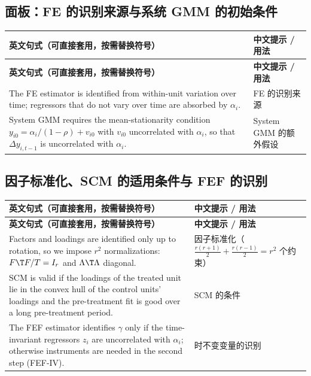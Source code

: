 \subsection{面板：FE 的识别来源与系统 GMM 的初始条件}

{\renewcommand{\arraystretch}{1.15}\begin{longtable}{@{}>{\raggedright\arraybackslash}p{11.4cm}>{\raggedright\arraybackslash\small}p{4.3cm}@{}}
\toprule
\textbf{英文句式（可直接套用，按需替换符号）} & \textbf{中文提示 / 用法}\\
\midrule
\endfirsthead
\toprule
\textbf{英文句式（可直接套用，按需替换符号）} & \textbf{中文提示 / 用法}\\
\midrule
\endhead
\bottomrule
\endlastfoot
The FE estimator is identified from within-unit variation over time; regressors that do not vary over time are absorbed by $\alpha_i$. & FE 的识别来源\\
\addlinespace[2pt]
System GMM requires the mean-stationarity condition $y_{i0}=\alpha_i/(1-\rho)+v_{i0}$ with $v_{i0}$ uncorrelated with $\alpha_i$, so that $\Delta y_{i,t-1}$ is uncorrelated with $\alpha_i$. & System GMM 的额外假设\\
\end{longtable}}


\subsection{因子标准化、SCM 的适用条件与 FEF 的识别}

{\renewcommand{\arraystretch}{1.15}\begin{longtable}{@{}>{\raggedright\arraybackslash}p{11.4cm}>{\raggedright\arraybackslash\small}p{4.3cm}@{}}
\toprule
\textbf{英文句式（可直接套用，按需替换符号）} & \textbf{中文提示 / 用法}\\
\midrule
\endfirsthead
\toprule
\textbf{英文句式（可直接套用，按需替换符号）} & \textbf{中文提示 / 用法}\\
\midrule
\endhead
\bottomrule
\endlastfoot
Factors and loadings are identified only up to rotation, so we impose $r^2$ normalizations: $F\T F/T=I_r$ and $\Lambda\T\Lambda$ diagonal. & 因子标准化（$\frac{r(r+1)}{2}+\frac{r(r-1)}{2}=r^2$ 个约束）\\
\addlinespace[2pt]
SCM is valid if the loadings of the treated unit lie in the convex hull of the control units' loadings and the pre-treatment fit is good over a long pre-treatment period. & SCM 的条件\\
\addlinespace[2pt]
The FEF estimator identifies $\gamma$ only if the time-invariant regressors $z_i$ are uncorrelated with $\alpha_i$; otherwise instruments are needed in the second step (FEF-IV). & 时不变变量的识别\\
\end{longtable}}


